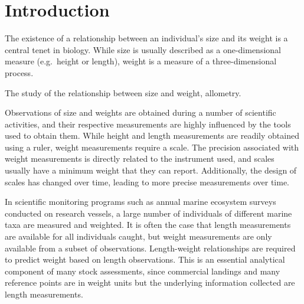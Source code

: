 \documentclass[12pt]{article}\usepackage[]{graphicx}\usepackage[]{color}
\begin{document}

\frontmatter


\renewcommand{\headrulewidth}{0.5pt}  %
\renewcommand{\footrulewidth}{0.5pt}  %

\newcommand{\lt}{\ensuremath <}
\newcommand{\gt}{\ensuremath >}

% 
\section{Introduction}\label{sec:introduction}

The existence of a relationship between an individual's size and its weight is a central tenet in biology. While size is usually described as a one-dimensional measure (e.g.~height or length), weight is a measure of a three-dimensional process.

The study of the relationship between size and weight, allometry.

Observations of size and weights are obtained during a number of scientific activities, and their respective measurements are highly influenced by the tools used to obtain them. While height and length measurements are readily obtained using a ruler, weight measurements require a scale. The precision associated with weight measurements is directly related to the instrument used, and scales usually have a minimum weight that they can report. Additionally, the design of scales has changed over time, leading to more precise measurements over time.

In scientific monitoring programs such as annual marine ecosystem surveys conducted on research vessels, a large number of individuals of different marine taxa are measured and weighted. It is often the case that length measurements are available for all individuals caught, but weight measurements are only available from a subset of observations. Length-weight relationships are required to predict weight based on length observations. This is an essential analytical component of many stock assessments, since commercial landings and many reference points are in weight units but the underlying information collected are length measurements.
\end{document}
